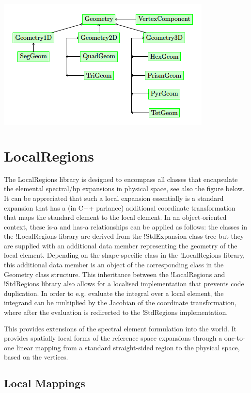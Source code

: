 \begin{center}
\includegraphics{img/SpatialDomains.png}
\end{center}


\section{LocalRegions}
The LocalRegions library is designed to encompass all classes that encapsulate
the elemental spectral/hp expansions in physical space, see also the figure
below. It can be appreciated that such a local expansion essentially is a
standard expansion that has a (in C++ parlance) additional coordinate
transformation that maps the standard element to the local element. In an
object-oriented context, these is-a and has-a relationships can be applied as
follows: the classes in the !LocalRegions library are derived from the
{!StdExpansion} class tree but they are supplied with an additional data member
representing the geometry of the local element. Depending on the shape-specific
class in the !LocalRegions library, this additional data member is an object of
the corresponding class in the Geometry class structure. This inheritance
between the !LocalRegions and !StdRegions library also allows for a localised
implementation that prevents code duplication. In order to e.g. evaluate the
integral over a local element, the integrand can be multiplied by the Jacobian
of the coordinate transformation, where after the evaluation is redirected to
the !StdRegions implementation.

This provides extensions of the spectral element formulation into the world. It
provides spatially local forms of the reference space expansions through a
one-to-one linear mapping from a standard straight-sided region to the physical
space, based on the vertices.

\subsection{Local Mappings}

